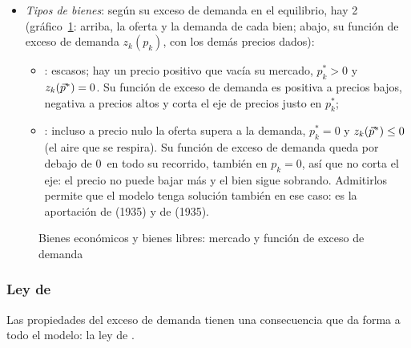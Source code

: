 \documentclass[11pt]{article}
\begin{document}
\begin{itemize}
\begin{enumerate}
  \item cumple la \emph{ley de }, $\vect{p}\cdot\vect{z}(\vect{p})\equiv 0$ (\ref{sec:ley-walras});
  \item está \emph{acotada inferiormente}, porque nadie puede ofrecer más de lo que tiene, y, si los bienes son deseables, cumple una \emph{condición de frontera}: cuando algún precio tiende a 0, el exceso de demanda de algún bien crece sin límite.
  \end{enumerate}
\item \emph{Tipos de bienes}: según su exceso de demanda en el equilibrio, hay 2 (gráfico~\ref{fig:bienes-libres}: arriba, la oferta y la demanda de cada bien; abajo, su función de exceso de demanda $z_k(p_k)$, con los demás precios dados):
  \begin{itemize}
  \item {}: escasos; hay un precio positivo que vacía su mercado, $p^*_k>0$ y $z_k(\vec{p}^*)=0$. Su función de exceso de demanda es positiva a precios bajos, negativa a precios altos y corta el eje de precios justo en $p^*_k$;
  \item {}: incluso a precio nulo la oferta supera a la demanda, $p^*_k=0$ y $z_k(\vec{p}^*)\leq 0$ (el aire que se respira). Su función de exceso de demanda queda por debajo de 0~en todo su recorrido, también en $p_k=0$, así que no corta el eje: el precio no puede bajar más y el bien sigue sobrando. Admitirlos permite que el modelo tenga solución también en ese caso: es la aportación de  (1935) y de  (1935).
  \end{itemize}
\end{itemize}

\begin{figure}[H]
\centering
\caption{Bienes económicos y bienes libres: mercado y función de exceso de demanda}\label{fig:bienes-libres}
\end{figure}

\subsubsection{Ley de }\label{sec:ley-walras}

Las propiedades del exceso de demanda tienen una consecuencia que da forma a todo el modelo: la ley de .
\end{document}
